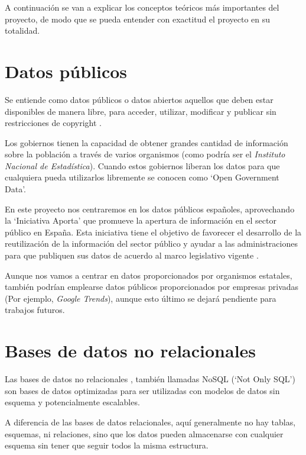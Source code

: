 
A continuación se van a explicar los conceptos teóricos más importantes del proyecto, de modo que se pueda entender con exactitud el proyecto en su totalidad.

\section{Datos públicos}

Se entiende como datos públicos o datos abiertos aquellos que deben estar disponibles de manera libre, para acceder, utilizar, modificar y publicar sin restricciones de copyright \cite{misc:datospublicos}.

Los gobiernos tienen la capacidad de obtener grandes cantidad de información sobre la población a través de varios organismos (como podría ser el \textit{Instituto Nacional de Estadística}). Cuando estos gobiernos liberan los datos para que cualquiera pueda utilizarlos libremente se conocen como `Open Government Data'.

En este proyecto nos centraremos en los datos públicos españoles, aprovechando la `Iniciativa Aporta' que promueve la apertura de información en el sector público en España. Esta iniciativa tiene el objetivo de favorecer el desarrollo de la reutilización de la información del sector público y ayudar a las administraciones para que publiquen sus datos de acuerdo al marco legislativo vigente \cite{misc:iniciativaaporta}.

Aunque nos vamos a centrar en datos proporcionados por organismos estatales, también podrían emplearse datos públicos proporcionados por empresas privadas (Por ejemplo, \textit{Google Trends}), aunque esto último se dejará pendiente para trabajos futuros.

\section{Bases de datos no relacionales}

Las bases de datos no relacionales \cite{wiki:nosql}, también llamadas NoSQL (`Not Only SQL') son bases de datos optimizadas para ser utilizadas con modelos de datos sin esquema y potencialmente escalables.

A diferencia de las bases de datos relacionales, aquí generalmente no hay tablas, esquemas, ni relaciones, sino que los datos pueden almacenarse con cualquier esquema sin tener que seguir todos la misma estructura.

